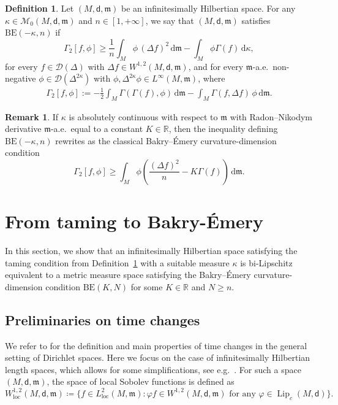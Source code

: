 \documentclass[10pt]{article}
\newcommand{\m}{\mathfrak{m}}
\newcommand{\M}{{\mathit{M}}}
\renewcommand{\d}{\,\mathrm{d}}
\newcommand{\D}{\mathscr{D}}
\newcommand{\dist}{\mathsf{d}}
\newcommand{\df}{\coloneqq}
\DeclareMathOperator{\Lip}{Lip}
\newcommand{\BE}{{\mathrm{BE}}}
\theoremstyle{plain}
\theoremstyle{definition}
\newtheorem{definition}[theorem]{Definition}
\newtheorem{remark}[theorem]{Remark}
\newcommand{\Linf}{L^{\infty}(M,\m)}
\newcommand{\Sob}{W^{1,2}(M,\dist,\m)}
\newcommand{\Ltwoloc}{L^2_{\text{loc}}(M,\m)}
\newcommand{\Sobloc}{W^{1,2}_{\text{loc}}(M,\dist,\m)}
\begin{document}
\begin{definition}\label{Def:BE}
Let $ (M,\dist,\m)$ be an infinitesimally Hilbertian space. For any $\kappa \in \mathcal{M}_0(M,\dist,\m)$  and $n \in [1,+\infty]$, we say that $(M,\dist,\m)$ satisfies $\mathrm{BE}(-\kappa,n)$ if
\begin{equation*}
\Gamma_2[f,\phi] \ge \frac{1}{n} \int_M \phi \,  (\Delta f)^2 \d \m - \int_M \phi  \Gamma(f) \d \kappa,
\end{equation*}
for every $f \in \D(\Delta)$ with $\Delta f \in \Sob$, and for every $\m$-a.e.~non-negative $\phi \in \D(\Delta^{2\kappa})$ with $\phi,\Delta^{2\kappa} \phi \in \Linf$, where
\begin{align*}
    \Gamma_2[f,\phi] := -\frac{1}{2}\int_\M\Gamma(\Gamma(f),\phi)\d\m - \int_\M\Gamma(f,\Delta f)\,\phi\d\m.
\end{align*}

\begin{remark}
    If $\kappa$ is absolutely continuous with respect to $\m$ with Radon--Nikodym derivative $\m$-a.e.~equal to a constant $K \in \mathbb{R}$, then the inequality defining $\BE(-\kappa,n)$ rewrites as the classical Bakry--\'Emery curvature-dimension condition \begin{equation*}
\Gamma_2[f,\phi] \ge  \int_M \phi  \left( \frac{(\Delta f)^2}{n}- K\Gamma(f)\right)\d \m.
\end{equation*}
\end{remark}
\end{definition}



\section{From taming to Bakry-\'Emery}

In this section, we show that an infinitesimally Hilbertian space satisfying the taming condition from Definition~\ref{Def:BE} with a suitable measure $\kappa$ is bi-Lipschitz equivalent to a metric measure space satisfying the Bakry--\'Emery curvature-dimension condition $\BE(K,N)$ for some $K \in \mathbb{R}$ and $N\ge n$.

\subsection{Preliminaries on time changes}


We refer to \cite[Chapter 5]{CF} for the definition and main properties of time changes in the general setting of Dirichlet spaces. Here we focus on the case of infinitesimally Hilbertian length spaces, which allows for some simplifications, see e.g.~\cite{SturmGAFA,hansturm}. For such a space $(M,\dist,\m)$, the space of local Sobolev functions is defined as
\[
\Sobloc \df \{f \in \Ltwoloc : \varphi f \in \Sob \text{ for any } \varphi\in \Lip_c(M,\dist)\}.
\]
\end{document}
